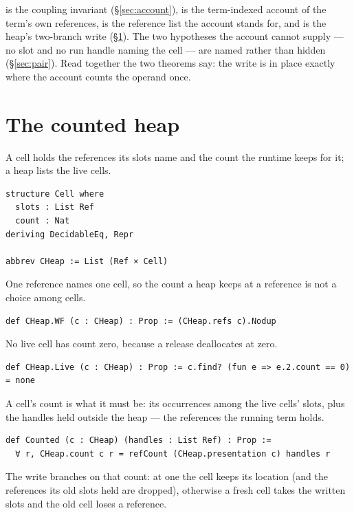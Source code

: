 \documentclass[11pt]{article}
\newcommand{\code}[1]{\texttt{\detokenize{#1}}}
\newcommand{\lref}[1]{\code{#1}}
\theoremstyle{remark}
\begin{document}
\noindent \lref{Couple} is the coupling invariant (\S\ref{sec:account}), \lref{Owns}
is the term-indexed account of the term's own references, \lref{expand m} is the
reference list the account stands for, and \lref{update} is the heap's two-branch
write (\S\ref{sec:heap}). The two hypotheses the account cannot supply --- no slot
and no run handle naming the cell --- are named rather than hidden
(\S\ref{sec:pair}). Read together the two theorems say: the write is in place
exactly where the account counts the operand once.

\section{The counted heap}
\label{sec:heap}

\noindent A cell holds the references its slots name and the count the runtime keeps
for it; a heap lists the live cells.

\begin{lstlisting}
structure Cell where
  slots : List Ref
  count : Nat
deriving DecidableEq, Repr

abbrev CHeap := List (Ref × Cell)
\end{lstlisting}

\noindent One reference names one cell, so the count a heap keeps at a reference is
not a choice among cells.

\begin{lstlisting}
def CHeap.WF (c : CHeap) : Prop := (CHeap.refs c).Nodup
\end{lstlisting}

\noindent No live cell has count zero, because a release deallocates at zero.

\begin{lstlisting}
def CHeap.Live (c : CHeap) : Prop := c.find? (fun e => e.2.count == 0) = none
\end{lstlisting}

\noindent A cell's count is what it must be: its occurrences among the live cells'
slots, plus the handles held outside the heap --- the references the running term
holds.

\begin{lstlisting}
def Counted (c : CHeap) (handles : List Ref) : Prop :=
  ∀ r, CHeap.count c r = refCount (CHeap.presentation c) handles r
\end{lstlisting}

\noindent The write branches on that count: at one the cell keeps its location (and
the references its old slots held are dropped), otherwise a fresh cell takes the
written slots and the old cell loses a reference.
\end{document}
